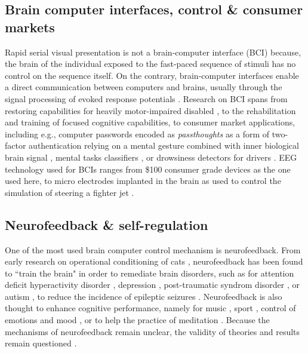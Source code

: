 \subsection{Brain computer interfaces, control \& consumer markets}
Rapid serial visual presentation is not a brain-computer interface (BCI) because, the brain of the individual exposed to the fast-paced sequence of stimuli has no control on the sequence itself. On the contrary, brain-computer interfaces enable a direct communication between computers and brains, usually through the signal processing of evoked response potentials \cite{vidal1973toward}. Research on BCI spans from restoring capabilities for heavily motor-impaired disabled \cite{galan2008brain}, to the rehabilitation and training  \cite{daly2008brain} of focused cognitive capabilities, to consumer market applications, including e.g., computer passwords encoded as {\it passthoughts} as a form of two-factor authentication relying on a mental gesture combined with inner biological brain signal \cite{chuang2013ithink,jonhson2014mythoughts}, mental tasks classifiers \cite{merrill2015}, or drowsiness detectors for drivers \cite{liu2013driverAlertness}. EEG technology used for BCIs ranges from \$100 consumer grade devices as the one used here, to micro electrodes implanted in the brain as used to control the simulation of steering a fighter jet \cite{BCIfighterJet2015}.

\subsection{Neurofeedback \& self-regulation}
One of the most used brain computer control mechanism is neurofeedback. From early research on operational conditioning of cats \cite{wyrwicka1968instrumental,sterman1969electrophysiological}, neurofeedback has been found to ``train the brain" in order to remediate brain disorders, such as for attention deficit hyperactivity disorder \cite{lubar1976eeg,monastra2006electroencephalographic},  depression \cite{saxby1995alpha},  post-traumatic syndrom disorder \cite{peniston1991alpha}, or autism \cite{kouijzer2009neurofeedback,coben2010neurofeedback}, to reduce the incidence of epileptic seizures \cite{sterman2006foundation}. Neurofeedback is also thought to enhance cognitive performance, namely for music \cite{egner2003ecological}, sport \cite{wilson2006mind}, control of emotions \cite{gruzelier2014eeg} and mood \cite{raymond2005effects}, or to help the practice of meditation \cite{gruzelier2009theory,rubik2011neurofeedback,brandmeyer2013meditation}. Because the mechanisms of neurofeedback remain unclear, the validity of theories and results remain questioned \cite{beyerstein1990brainscams,vernon2009alpha}.

